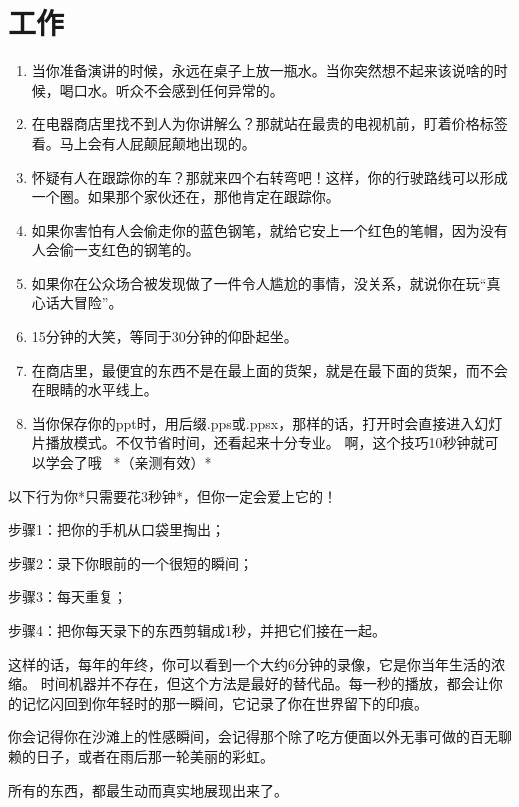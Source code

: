 \documentclass[12pt,oneside]{book}
\begin{document}
\chapter{工作}
\begin{tcolorbox}[colback=orange!5,colframe=orange!75!black]
	\begin{enumerate}
\item  当你准备演讲的时候，永远在桌子上放一瓶水。当你突然想不起来该说啥的时候，喝口水。听众不会感到任何异常的。
\item  在电器商店里找不到人为你讲解么？那就站在最贵的电视机前，盯着价格标签看。马上会有人屁颠屁颠地出现的。
\item  怀疑有人在跟踪你的车？那就来四个右转弯吧！这样，你的行驶路线可以形成一个圈。如果那个家伙还在，那他肯定在跟踪你。
\item 如果你害怕有人会偷走你的蓝色钢笔，就给它安上一个红色的笔帽，因为没有人会偷一支红色的钢笔的。
\item  如果你在公众场合被发现做了一件令人尴尬的事情，没关系，就说你在玩“真心话大冒险”。
\item 15分钟的大笑，等同于30分钟的仰卧起坐。
\item  在商店里，最便宜的东西不是在最上面的货架，就是在最下面的货架，而不会在眼睛的水平线上。
\item 当你保存你的ppt时，用后缀.pps或.ppsx，那样的话，打开时会直接进入幻灯片播放模式。不仅节省时间，还看起来十分专业。
啊，这个技巧10秒钟就可以学会了哦~
*（亲测有效）*
\end{enumerate}
\end{tcolorbox}

\begin{proposition}[生活情调]
以下行为你*只需要花3秒钟*，但你一定会爱上它的！

步骤1：把你的手机从口袋里掏出；

步骤2：录下你眼前的一个很短的瞬间；

步骤3：每天重复；

步骤4：把你每天录下的东西剪辑成1秒，并把它们接在一起。

这样的话，每年的年终，你可以看到一个大约6分钟的录像，它是你当年生活的浓缩。
时间机器并不存在，但这个方法是最好的替代品。每一秒的播放，都会让你的记忆闪回到你年轻时的那一瞬间，它记录了你在世界留下的印痕。

你会记得你在沙滩上的性感瞬间，会记得那个除了吃方便面以外无事可做的百无聊赖的日子，或者在雨后那一轮美丽的彩虹。

所有的东西，都最生动而真实地展现出来了。

\end{proposition}
\end{document}
